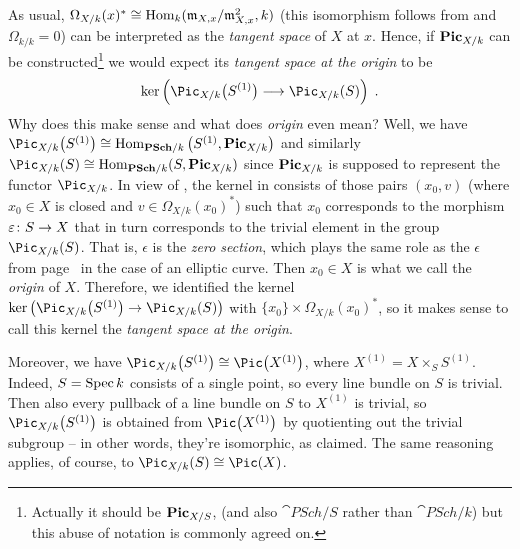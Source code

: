 \documentclass[a4paper,parskip=half,numbers=enddot, DIV=12]{scrreprt}
\begin{document}
\begin{rem}
	As usual, $\Omega_{X/k}(x)^*\cong \operatorname{Hom}_k(\mathfrak{m}_{X,x}/\mathfrak{m}_{X,x}^2,k)$ (this isomorphism follows from \cite[Lemma~1.6.1]{alg2} and $\Omega_{k/k}=0$) can be interpreted as the \emph{tangent space} of $X$ at $x$. Hence, if $\mathbf{Pic}_{X/k}$ can be constructed\footnote{Actually it should be $\mathbf{Pic}_{X/S}$, (and also $\cat{PSch}/S$ rather than $\cat{PSch}/k$) but this abuse of notation is commonly agreed on.} we would expect its \emph{tangent space at the origin} to be
	\begin{align}\lbl{eq:TangentSpaceAtTheOrigin}
		\ker\left(\Pic_{X/k}\big(S^{(1)}\big)\morphism\Pic_{X/k}(S)\right)\;.%
	\end{align}
	Why does this make sense and what does \emph{origin} even mean? Well, we have $\Pic_{X/k}\big(S^{(1)}\big)\cong \Hom_{\cat{PSch}/k}\big(S^{(1)},\PIC_{X/k}\big)$ and similarly $\Pic_{X/k}(S)\cong \Hom_{\cat{PSch}/k}(S,\PIC_{X/k})$ since $\mathbf{Pic}_{X/k}$ is supposed to represent the functor $\Pic_{X/k}$. In view of , the kernel in  consists of those pairs $(x_0,v)$ (where $x_0\in X$ is closed and $v\in\Omega_{X/k}(x_0)^*$) such that $x_0$ corresponds to the morphism $\epsilon\colon S\morphism X$ that in turn corresponds to the trivial element in the group $\Pic_{X/k}(S)$. That is, $\epsilon$ is the \emph{zero section}, which plays the same role as the $\epsilon$ from page~\pageref{par:EllipticCurves} in the case of an elliptic curve. Then $x_0\in X$ is what we call the \emph{origin} of $X$. Therefore, we identified the kernel $\ker\big(\Pic_{X/k}\big(S^{(1)}\big)\morphism\Pic_{X/k}(S)\big)$ with $\{x_0\}\times\Omega_{X/k}(x_0)^*$, so it makes sense to call this kernel the \emph{tangent space at the origin}.
	
	Moreover, we have $\Pic_{X/k}\big(S^{(1)}\big)\cong \Pic\big(X^{(1)}\big)$, where $X^{(1)}=X\times_SS^{(1)}$. Indeed, $S=\operatorname{Spec} k$ consists of a single point, so every line bundle on $S$ is trivial. Then also every pullback of a line bundle on $S$ to $X^{(1)}$ is trivial, so $\Pic_{X/k}\big(S^{(1)}\big)$ is obtained from $\Pic\big(X^{(1)}\big)$ by quotienting out the trivial subgroup -- in other words, they're isomorphic, as claimed. The same reasoning applies, of course, to $\Pic_{X/k}(S)\cong \Pic(X)$.
	

\end{rem}
\end{document}
